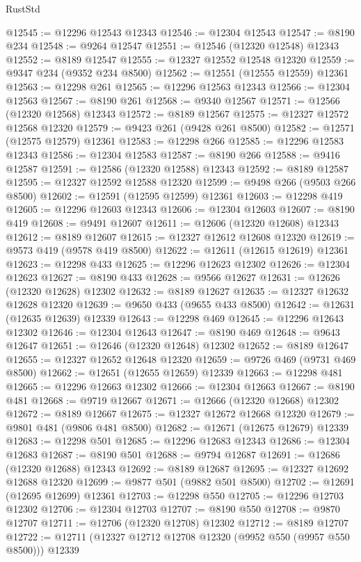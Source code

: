 \begin{lexlean}{RustStd}
\begin{coremodule}
@12545 := @12296 @12543 @12343
@12546 := @12304 @12543
@12547 := @8190 @234
@12548 := @9264 @12547
@12551 := @12546 (@12320 @12548) @12343
@12552 := @8189 @12547
@12555 := @12327 @12552 @12548 @12320
@12559 := @9347 @234 (@9352 @234 @8500)
@12562 := @12551 (@12555 @12559) @12361
@12563 := @12298 @261
@12565 := @12296 @12563 @12343
@12566 := @12304 @12563
@12567 := @8190 @261
@12568 := @9340 @12567
@12571 := @12566 (@12320 @12568) @12343
@12572 := @8189 @12567
@12575 := @12327 @12572 @12568 @12320
@12579 := @9423 @261 (@9428 @261 @8500)
@12582 := @12571 (@12575 @12579) @12361
@12583 := @12298 @266
@12585 := @12296 @12583 @12343
@12586 := @12304 @12583
@12587 := @8190 @266
@12588 := @9416 @12587
@12591 := @12586 (@12320 @12588) @12343
@12592 := @8189 @12587
@12595 := @12327 @12592 @12588 @12320
@12599 := @9498 @266 (@9503 @266 @8500)
@12602 := @12591 (@12595 @12599) @12361
@12603 := @12298 @419
@12605 := @12296 @12603 @12343
@12606 := @12304 @12603
@12607 := @8190 @419
@12608 := @9491 @12607
@12611 := @12606 (@12320 @12608) @12343
@12612 := @8189 @12607
@12615 := @12327 @12612 @12608 @12320
@12619 := @9573 @419 (@9578 @419 @8500)
@12622 := @12611 (@12615 @12619) @12361
@12623 := @12298 @433
@12625 := @12296 @12623 @12302
@12626 := @12304 @12623
@12627 := @8190 @433
@12628 := @9566 @12627
@12631 := @12626 (@12320 @12628) @12302
@12632 := @8189 @12627
@12635 := @12327 @12632 @12628 @12320
@12639 := @9650 @433 (@9655 @433 @8500)
@12642 := @12631 (@12635 @12639) @12339
@12643 := @12298 @469
@12645 := @12296 @12643 @12302
@12646 := @12304 @12643
@12647 := @8190 @469
@12648 := @9643 @12647
@12651 := @12646 (@12320 @12648) @12302
@12652 := @8189 @12647
@12655 := @12327 @12652 @12648 @12320
@12659 := @9726 @469 (@9731 @469 @8500)
@12662 := @12651 (@12655 @12659) @12339
@12663 := @12298 @481
@12665 := @12296 @12663 @12302
@12666 := @12304 @12663
@12667 := @8190 @481
@12668 := @9719 @12667
@12671 := @12666 (@12320 @12668) @12302
@12672 := @8189 @12667
@12675 := @12327 @12672 @12668 @12320
@12679 := @9801 @481 (@9806 @481 @8500)
@12682 := @12671 (@12675 @12679) @12339
@12683 := @12298 @501
@12685 := @12296 @12683 @12343
@12686 := @12304 @12683
@12687 := @8190 @501
@12688 := @9794 @12687
@12691 := @12686 (@12320 @12688) @12343
@12692 := @8189 @12687
@12695 := @12327 @12692 @12688 @12320
@12699 := @9877 @501 (@9882 @501 @8500)
@12702 := @12691 (@12695 @12699) @12361
@12703 := @12298 @550
@12705 := @12296 @12703 @12302
@12706 := @12304 @12703
@12707 := @8190 @550
@12708 := @9870 @12707
@12711 := @12706 (@12320 @12708) @12302
@12712 := @8189 @12707
@12722 := @12711 (@12327 @12712 @12708 @12320 (@9952 @550 (@9957 @550 @8500))) @12339

\end{coremodule}
\end{lexlean}
